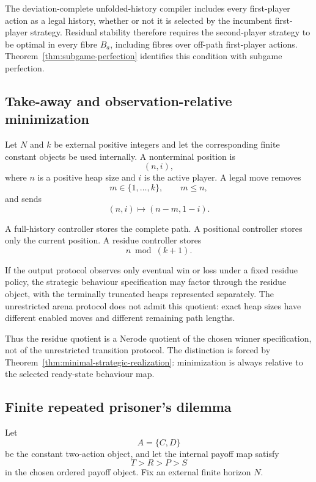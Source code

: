 The deviation-complete unfolded-history compiler includes every first-player action as a legal
history, whether or not it is selected by the incumbent first-player strategy. Residual stability
therefore requires the second-player strategy to be optimal in every fibre \(B_a\), including fibres
over off-path first-player actions. Theorem~\ref{thm:subgame-perfection} identifies this condition
with subgame perfection.

\subsection{Take-away and observation-relative minimization}
\label{subsec:take-away-minimization}

Let \(N\) and \(k\) be external positive integers and let the corresponding finite constant objects
be used internally. A nonterminal position is
\[
  (n,i),
\]
where \(n\) is a positive heap size and \(i\) is the active player. A legal move removes
\[
  m\in\{1,\ldots,k\},
  \qquad
  m\leq n,
\]
and sends
\[
  (n,i)\longmapsto(n-m,1-i).
\]

A full-history controller stores the complete path. A positional controller stores only the current
position. A residue controller stores
\[
  n\bmod(k+1).
\]

If the output protocol observes only eventual win or loss under a fixed residue policy, the
strategic behaviour specification may factor through the residue object, with the terminally
truncated heaps represented separately. The unrestricted arena protocol does not admit this
quotient: exact heap sizes have different enabled moves and different remaining path lengths.

Thus the residue quotient is a Nerode quotient of the chosen winner specification, not of the
unrestricted transition protocol. The distinction is forced by
Theorem~\ref{thm:minimal-strategic-realization}: minimization is always relative to the selected
ready-state behaviour map.

\subsection{Finite repeated prisoner's dilemma}
\label{subsec:repeated-prisoners-dilemma}

Let
\[
  A=\{C,D\}
\]
be the constant two-action object, and let the internal payoff map satisfy
\[
  T>R>P>S
\]
in the chosen ordered payoff object. Fix an external finite horizon \(N\).

